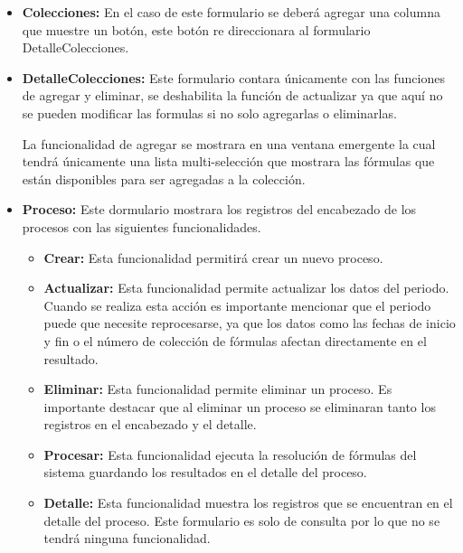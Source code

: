 		\begin{itemize}
			\item \textbf{Colecciones:} En el caso de este formulario se deber\'a agregar una columna que muestre un bot\'on, este bot\'on re direccionara al formulario DetalleColecciones.
			\item \textbf{DetalleColecciones:} Este formulario contara \'unicamente con las funciones de agregar y eliminar, se deshabilita la funci\'on de actualizar ya que aqu\'i no se pueden modificar las formulas si no solo agregarlas o eliminarlas. 

			La funcionalidad de agregar se mostrara en una ventana emergente la cual tendr\'a \'unicamente una lista multi-selecci\'on que mostrara las f\'ormulas que est\'an disponibles para ser agregadas a la colecci\'on.
			\item \textbf{Proceso:} Este dormulario mostrara los registros del encabezado de los procesos con las siguientes funcionalidades.
			\begin{itemize}
				\item \textbf{Crear:} Esta funcionalidad permitir\'a crear un nuevo proceso.
				\item \textbf{Actualizar:} Esta funcionalidad permite actualizar los datos del periodo. Cuando se realiza esta acci\'on es importante mencionar que el periodo puede que necesite reprocesarse, ya que los datos como las fechas de inicio y fin o el n\'umero de colecci\'on de f\'ormulas afectan directamente en el resultado.
				\item \textbf{Eliminar:} Esta funcionalidad permite eliminar un proceso. Es importante destacar que al eliminar un proceso se eliminaran tanto los registros en el encabezado y el detalle.
				\item \textbf{Procesar:} Esta funcionalidad ejecuta la resoluci\'on de f\'ormulas del sistema guardando los resultados en el detalle del proceso.
				\item \textbf{Detalle:} Esta funcionalidad muestra los registros que se encuentran en el detalle del proceso. Este formulario es solo de consulta por lo que no se tendr\'a ninguna funcionalidad.
			\end{itemize}
		\end{itemize}


